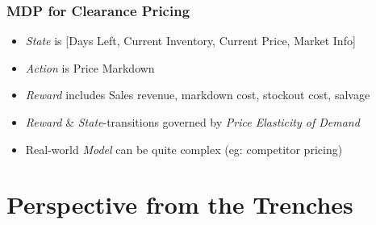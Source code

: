 \documentclass[handout]{beamer}
\begin{document}
\begin{frame}
\frametitle{MDP for Clearance Pricing}
\pause
\begin{itemize}[<+->]
\item {\em State} is [Days Left, Current Inventory, Current Price, Market Info]
\item {\em Action} is Price Markdown
\item {\em Reward} includes Sales revenue, markdown cost, stockout cost, salvage
\item {\em Reward} \& {\em State}-transitions governed by {\em Price Elasticity of Demand}
\item Real-world {\em Model} can be quite complex (eg: competitor pricing)
\end{itemize}
\end{frame}

\section{Perspective from the Trenches}
\end{document}

